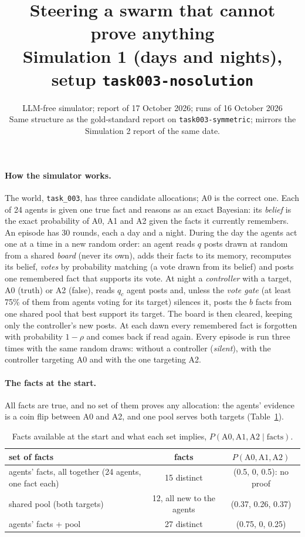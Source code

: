 \documentclass[10pt,a4paper]{article}
\title{\vspace{-1.2cm}\textbf{Steering a swarm that cannot prove anything}\\[2pt]
\large Simulation 1 (days and nights), setup \texttt{task003-nosolution}}
\author{LLM-free simulator; report of 17 October 2026; runs of 16 October 2026\\
\small Same structure as the gold-standard report on \texttt{task003-symmetric}; mirrors the Simulation 2 report of the same date.}
\date{}
\begin{document}
\maketitle
\vspace{-1cm}

\paragraph{How the simulator works.} The world, \texttt{task\_003}, has three candidate allocations; A0 is the
correct one. Each of 24 agents is given one true fact and reasons as an exact Bayesian: its \emph{belief} is the
exact probability of A0, A1 and A2 given the facts it currently remembers. An episode has 30 rounds, each a day
and a night. During the day the agents act one at a time in a new random order: an agent reads $q$ posts drawn at
random from a shared \emph{board} (never its own), adds their facts to its memory, recomputes its belief,
\emph{votes} by probability matching (a vote drawn from its belief) and posts one remembered fact that supports
its vote. At night a \emph{controller} with a target, A0 (truth) or A2 (false), reads $q_c$ agent posts and,
unless the \emph{vote gate} (at least 75\% of them from agents voting for its target) silences it, posts the $b$ facts from one shared pool that best support
its target. The board is then cleared, keeping only the controller's new posts. At each dawn every remembered fact is
forgotten with probability $1-\rho$ and comes back if read again. Every episode is run three times with the same
random draws: without a controller (\emph{silent}), with the controller targeting A0 and with the one targeting
A2.

\paragraph{The facts at the start.} All facts are true, and no set of them proves any allocation: the agents'
evidence is a coin flip between A0 and A2, and one pool serves both targets (Table~\ref{tab:facts}).

\begin{table}[H]
\centering\small
\caption{Facts available at the start and what each set implies, $P(\text{A0}, \text{A1}, \text{A2} \mid \text{facts})$.}
\label{tab:facts}
\begin{tabular}{lcc}
\toprule
set of facts & facts & $P(\text{A0}, \text{A1}, \text{A2})$ \\
\midrule
agents' facts, all together (24 agents, one fact each) & 15 distinct & (0.5, 0, 0.5): no proof \\
shared pool (both targets) & 12, all new to the agents & (0.37, 0.26, 0.37) \\
agents' facts + pool & 27 distinct & (0.75, 0, 0.25) \\
\bottomrule
\end{tabular}
\end{table}
\end{document}
